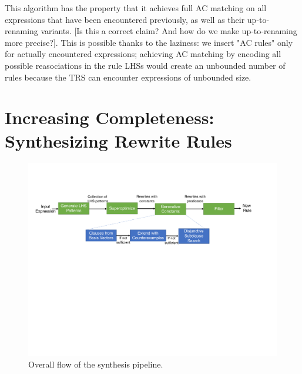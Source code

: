 \documentclass[acmsmall,review]{acmart}\settopmatter{printfolios=true,printccs=false,printacmref=false}
\begin{document}
This algorithm has the property that it achieves full AC matching on all expressions that have been encountered previously, as well as their up-to-renaming variants. [Is this a correct claim? And how do we make up-to-renaming more precise?]. This is possible thanks to the laziness: we insert "AC rules" only for actually encountered expressions; achieving AC matching by encoding all possible reasociations in the rule LHSs would create an unbounded number of rules because the TRS can encounter expressions of unbounded size. 


\section{Increasing Completeness: Synthesizing Rewrite Rules}
\begin{figure}
\includegraphics[width=1.\columnwidth]{figures/synthesis-flow.pdf}
\caption{Overall flow of the synthesis pipeline.}
\label{fig:synthesis-flow}
\end{figure}
\end{document}
